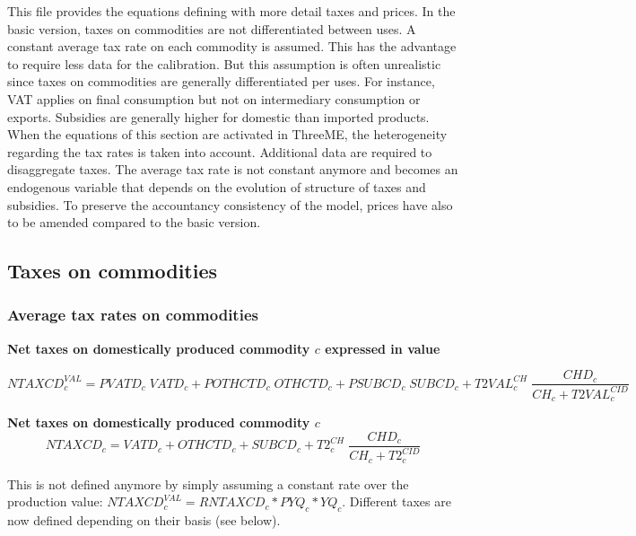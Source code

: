 \documentclass[12pt]{article}
\numberwithin{equation}{section}
\begin{document}
This file provides the equations defining with more detail taxes and prices. In the basic version, taxes on commodities are not differentiated between uses. A constant average tax rate on each commodity is assumed. This has the advantage to require less data for the calibration. But this assumption is often unrealistic since taxes on commodities are generally differentiated per uses. For instance, VAT applies on final consumption but not on intermediary consumption or exports. Subsidies are generally higher for domestic than imported products. When the equations of this section are activated in ThreeME, the heterogeneity regarding the tax rates is taken into account. Additional data are required to disaggregate taxes. The average tax rate is not constant anymore and becomes an endogenous variable that depends on the evolution of structure of taxes and subsidies. To preserve the accountancy consistency of the model, prices have also to be amended compared to the basic version. \\



\subsection{ Taxes on commodities}





\subsubsection{Average tax rates on commodities}



\noindent \textbf{Net taxes on domestically produced commodity $c$ expressed in value} 

\begin{dmath}
NTAXCD^{VAL}_{c} = PVATD_{c} \; VATD_{c} + POTHCTD_{c} \; OTHCTD_{c} + PSUBCD_{c} \; SUBCD_{c} + T2VAL^{CH}_{c} \; \frac{CHD_{c}}{CH_{c} + T2VAL^{CID}_{c}}
\label{Exception_taxes_prices.mdlNTAXCD_VAL[c]}
\end{dmath}

\noindent \textbf{Net taxes on domestically produced commodity $c$} 
\begin{dmath}
NTAXCD_{c} = VATD_{c} + OTHCTD_{c} + SUBCD_{c} + T2^{CH}_{c} \; \frac{CHD_{c}}{CH_{c} + T2^{CID}_{c}}
\label{Exception_taxes_prices.mdlNTAXCD[c]}
\end{dmath}


This is not defined anymore by simply assuming a constant rate over the production value: $NTAXCD^{VAL}_{c} = RNTAXCD_{c}*PYQ_{c}*YQ_{c}$. Different taxes are now defined depending on their basis (see below). \\
\end{document}

